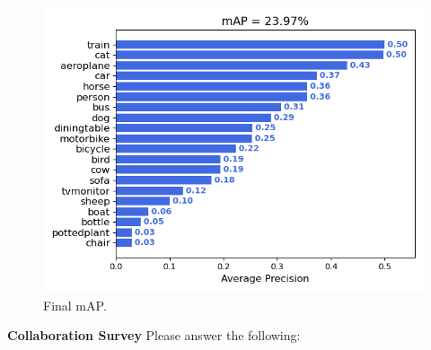 \documentclass[11pt,addpoints,answers]{exam}
\numberwithin{equation}{section} %
\numberwithin{figure}{section} %
\numberwithin{table}{section} %
\begin{document}
\begin{questions}
\begin{figure}[H]
    \centering
    \includegraphics{./results/q3/mAP.png}
    \caption{Final mAP.}
    \label{fig:final_mAP}
\end{figure}
\end{questions}



\clearpage

\textbf{Collaboration Survey} Please answer the following:
\end{document}
